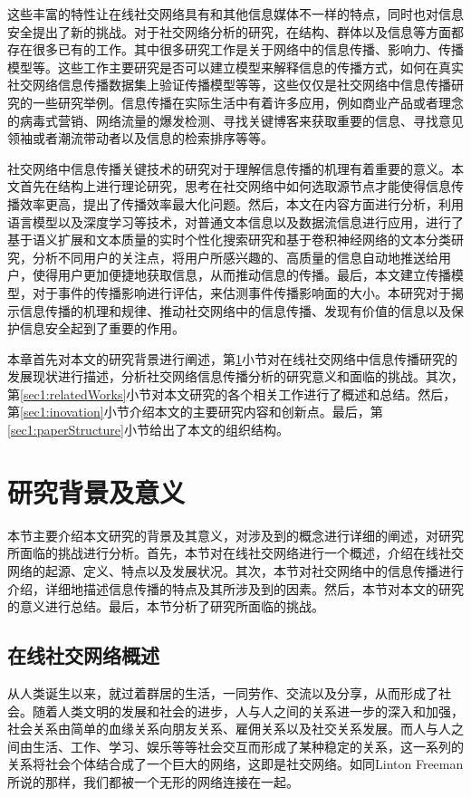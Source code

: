 这些丰富的特性让在线社交网络具有和其他信息媒体不一样的特点，同时也对信息安全提出了新的挑战。对于社交网络分析的研究，在结构、群体以及信息等方面都存在很多已有的工作。其中很多研究工作是关于网络中的信息传播、影响力、传播模型等。这些工作主要研究是否可以建立模型来解释信息的传播方式，如何在真实社交网络信息传播数据集上验证传播模型等等，这些仅仅是社交网络中信息传播研究的一些研究举例。信息传播在实际生活中有着许多应用，例如商业产品或者理念的病毒式营销、网络流量的爆发检测、寻找关键博客来获取重要的信息、寻找意见领袖或者潮流带动者以及信息的检索排序等等。

社交网络中信息传播关键技术的研究对于理解信息传播的机理有着重要的意义。本文首先在结构上进行理论研究，思考在社交网络中如何选取源节点才能使得信息传播效率更高，提出了传播效率最大化问题。然后，本文在内容方面进行分析，利用语言模型以及深度学习等技术，对普通文本信息以及数据流信息进行应用，进行了基于语义扩展和文本质量的实时个性化搜索研究和基于卷积神经网络的文本分类研究，分析不同用户的关注点，将用户所感兴趣的、高质量的信息自动地推送给用户，使得用户更加便捷地获取信息，从而推动信息的传播。最后，本文建立传播模型，对于事件的传播影响进行评估，来估测事件传播影响面的大小。本研究对于揭示信息传播的机理和规律、推动社交网络中的信息传播、发现有价值的信息以及保护信息安全起到了重要的作用。

本章首先对本文的研究背景进行阐述，第\ref{sec1:background}小节对在线社交网络中信息传播研究的发展现状进行描述，分析社交网络信息传播分析的研究意义和面临的挑战。其次，第\ref{sec1:relatedWorks}小节对本文研究的各个相关工作进行了概述和总结。然后，第\ref{sec1:inovation}小节介绍本文的主要研究内容和创新点。最后，第\ref{sec1:paperStructure}小节给出了本文的组织结构。

\section{研究背景及意义}
\label{sec1:background}
本节主要介绍本文研究的背景及其意义，对涉及到的概念进行详细的阐述，对研究所面临的挑战进行分析。首先，本节对在线社交网络进行一个概述，介绍在线社交网络的起源、定义、特点以及发展状况。其次，本节对社交网络中的信息传播进行介绍，详细地描述信息传播的特点及其所涉及到的因素。然后，本节对本文的研究的意义进行总结。最后，本节分析了研究所面临的挑战。
\subsection{在线社交网络概述}
\label{subsec1:introduction}
从人类诞生以来，就过着群居的生活，一同劳作、交流以及分享，从而形成了社会。随着人类文明的发展和社会的进步，人与人之间的关系进一步的深入和加强，社会关系由简单的血缘关系向朋友关系、雇佣关系以及社交关系发展。而人与人之间由生活、工作、学习、娱乐等等社会交互而形成了某种稳定的关系，这一系列的关系将社会个体结合成了一个巨大的网络，这即是社交网络。如同Linton Freeman所说的那样，我们都被一个无形的网络连接在一起。

